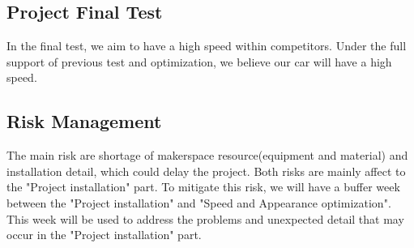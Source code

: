 \documentclass[12pt]{article}
\begin{document}
\subsection{Project Final Test}
In the final test, we aim to have a high speed within competitors. Under the full support of previous test and optimization, we believe our car will have a high speed.
\subsection{Risk Management}
The main risk are shortage of makerspace resource(equipment and material) and installation detail, which could delay the project.
Both risks are mainly affect to the "Project installation" part. To mitigate this risk, we will have a buffer week between the "Project installation" and "Speed and Appearance optimization". 
This week will be used to address the problems and unexpected detail that may occur in the "Project installation" part. 
\end{document}
